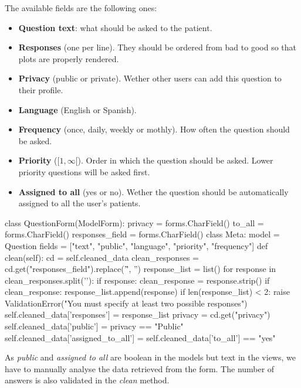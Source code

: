 \documentclass[12pt,english]{article}
\begin{document}
The available fields are the following ones:
\begin{itemize}
  \item \textbf{Question text}: what should be asked to the patient.
  \item \textbf{Responses} (one per line). They should be ordered from bad to good so that plots are properly rendered.
  \item \textbf{Privacy} (public or private). Wether other users can add this question to their profile.
  \item \textbf{Language} (English or Spanish).
  \item \textbf{Frequency} (once, daily, weekly or mothly). How often the question should be asked.
  \item \textbf{Priority} ($[1,\infty[$). Order in which the question should be asked. Lower priority questions will be asked first.
  \item \textbf{Assigned to all} (yes or no). Wether the question should be automatically assigned to all the user's patients.
\end{itemize}

\begin{python}[caption={Form to create or modify questions}, captionpos=b]
class QuestionForm(ModelForm):
    privacy = forms.CharField()
    to_all = forms.CharField()
    responses_field = forms.CharField()
    class Meta:
        model = Question
        fields = ["text", "public", "language", "priority", "frequency"]
    def clean(self):
        cd = self.cleaned_data
        clean_responses = cd.get("responses_field").replace('\r', '')
        response_list = list()
        for response in clean_responses.split('\n'):
            if response:
                clean_response = response.strip()
                if clean_response:
                    response_list.append(response)
        if len(response_list) < 2:
            raise ValidationError("You must specify at least two possible responses")
        self.cleaned_data['responses'] = response_list
        privacy = cd.get("privacy")
        self.cleaned_data['public'] = privacy == "Public"
        self.cleaned_data['assigned_to_all'] = self.cleaned_data['to_all'] == "yes"
\end{python}

As \emph{public} and \emph{assigned to all} are boolean in the models but text in the views, we have to manually analyse the data retrieved from the form. The number of answers is also validated in the \emph{clean} method.
\end{document}
